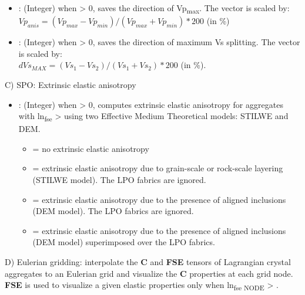 \begin{itemize}
	\item {}: (Integer) when > 0, saves the direction of Vp\textsubscript{max}. The vector is scaled by:\\ 
	$Vp_{anis} = (Vp_{max} - Vp_{min})/ (Vp_{max} + Vp_{min})*200$ (in \%)
	
	\item {}: (Integer) when > 0, saves the direction of maximum Vs splitting. The vector is scaled by:\\ 
	$dVs_{MAX} = (Vs_1 - Vs_2)/ (Vs_1 + Vs_2)*200$ (in \%).
	
\end{itemize}

C) SPO: Extrinsic elastic anisotropy\footnotemark
\begin{itemize}
    \item {}: (Integer) when > 0, computes extrinsic elastic anisotropy for aggregates with  ln\textsubscript{fse} >  using two Effective Medium Theoretical models: STILWE and DEM.
    \begin{itemize}
        \item[]  = no extrinsic elastic anisotropy
        \item[]  = extrinsic elastic anisotropy due to grain-scale or rock-scale layering (STILWE model). The LPO fabrics are ignored.
        \item[]  = extrinsic elastic anisotropy due to the presence of aligned inclusions (DEM model). The LPO fabrics are ignored.
        \item[]  = extrinsic elastic anisotropy due to the presence of aligned inclusions (DEM model) superimposed over  the LPO fabrics.
    \end{itemize}
\end{itemize}


D) Eulerian gridding: interpolate the \textbf{C} and \textbf{FSE} tensors of Lagrangian crystal aggregates to an Eulerian grid and visualize the \textbf{C} properties at each grid node. \textbf{FSE} is used to visualize a given elastic properties only when ln\textsubscript{fse NODE} > .

